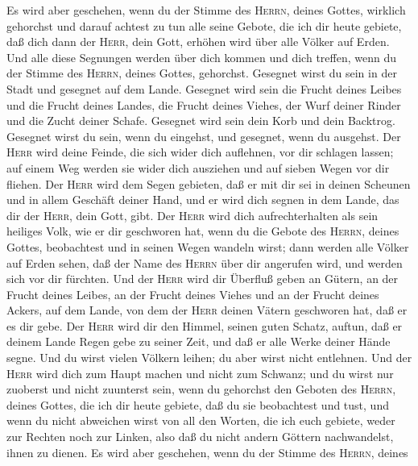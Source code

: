  Es wird aber geschehen, wenn du der Stimme des
\textsc{Herrn}, deines Gottes, wirklich gehorchst und darauf achtest zu
tun alle seine Gebote, die ich dir heute gebiete, daß dich dann der
\textsc{Herr}, dein Gott, erhöhen wird über alle Völker auf Erden.
 Und alle diese Segnungen werden über dich kommen und dich
treffen, wenn du der Stimme des \textsc{Herrn}, deines Gottes,
gehorchst.  Gesegnet wirst du sein in der Stadt und
gesegnet auf dem Lande.  Gesegnet wird sein die Frucht
deines Leibes und die Frucht deines Landes, die Frucht deines Viehes,
der Wurf deiner Rinder und die Zucht deiner Schafe. 
Gesegnet wird sein dein Korb und dein Backtrog.  Gesegnet
wirst du sein, wenn du eingehst, und gesegnet, wenn du ausgehst.
 Der \textsc{Herr} wird deine Feinde, die sich wider dich
auflehnen, vor dir schlagen lassen; auf einem Weg werden sie wider dich
ausziehen und auf sieben Wegen vor dir fliehen.  Der
\textsc{Herr} wird dem Segen gebieten, daß er mit dir sei in deinen
Scheunen und in allem Geschäft deiner Hand, und er wird dich segnen in
dem Lande, das dir der \textsc{Herr}, dein Gott, gibt. 
Der \textsc{Herr} wird dich aufrechterhalten als sein heiliges Volk, wie
er dir geschworen hat, wenn du die Gebote des \textsc{Herrn}, deines
Gottes, beobachtest und in seinen Wegen wandeln wirst; 
dann werden alle Völker auf Erden sehen, daß der Name des \textsc{Herrn}
über dir angerufen wird, und werden sich vor dir fürchten.
 Und der \textsc{Herr} wird dir Überfluß geben an Gütern,
an der Frucht deines Leibes, an der Frucht deines Viehes und an der
Frucht deines Ackers, auf dem Lande, von dem der \textsc{Herr} deinen
Vätern geschworen hat, daß er es dir gebe.  Der
\textsc{Herr} wird dir den Himmel, seinen guten Schatz, auftun, daß er
deinem Lande Regen gebe zu seiner Zeit, und daß er alle Werke deiner
Hände segne. Und du wirst vielen Völkern leihen; du aber wirst nicht
entlehnen.  Und der \textsc{Herr} wird dich zum Haupt
machen und nicht zum Schwanz; und du wirst nur zuoberst und nicht
zuunterst sein, wenn du gehorchst den Geboten des \textsc{Herrn}, deines
Gottes, die ich dir heute gebiete, daß du sie beobachtest und tust,
 und wenn du nicht abweichen wirst von all den Worten,
die ich euch gebiete, weder zur Rechten noch zur Linken, also daß du
nicht andern Göttern nachwandelst, ihnen zu dienen.  Es
wird aber geschehen, wenn du der Stimme des \textsc{Herrn}, deines
